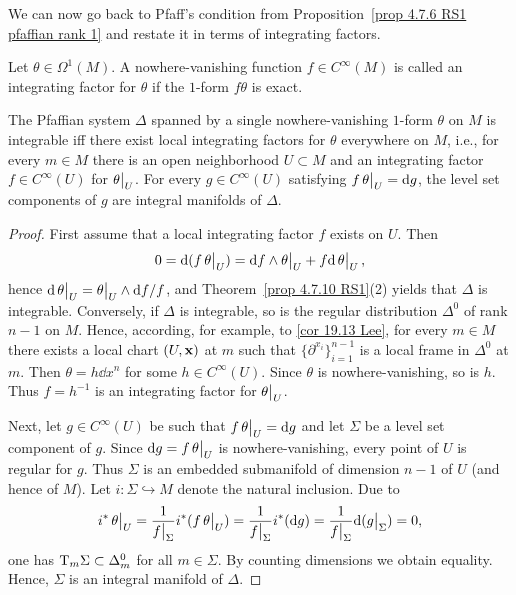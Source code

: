We can now go back to Pfaff's condition from Proposition~\ref{prop 4.7.6 RS1 pfaffian rank 1} and restate it in terms of integrating factors.

\begin{defn}
    Let $\theta\in\Omega^1(M)$. A nowhere-vanishing function $f\in C^\infty(M)$ is called an integrating factor for $\theta$ if the $1$-form $f\theta$ is exact.
\end{defn}

\begin{prop}[{{\cite[Prop.~4.7.13]{RS1}}}]\label{prop 4.7.13 RS1}
    The Pfaffian system $\Delta$ spanned by a single nowhere-vanishing $1$-form $\theta$ on $M$ is integrable iff there exist local integrating factors for $\theta$ everywhere on $M$, i.e., for every $m\in M$ there is an open neighborhood $U\subset M$ and an integrating factor $f\in C^\infty(U)$ for $\restr{\theta}{U}$. For every $g\in C^\infty(U)$ satisfying $f\restr{\theta}{U}=\dd g$, the level set components of $g$ are integral manifolds of $\Delta$.
\end{prop}
\begin{proof}
    First assume that a local integrating factor $f$ exists on $U$. Then 
    \[0=\dd(f\restr{\theta}{U})=\dd f\wedge\restr{\theta}{U}+f\dd\restr{\theta}{U},\]
    hence $\dd\restr{\theta}{U}=\restr{\theta}{U}\wedge \dd f/f$, and Theorem~\ref{prop 4.7.10 RS1}(2) yields that $\Delta$ is integrable. Conversely, if $\Delta$ is integrable, so is the regular distribution $\Delta^0$ of rank $n-1$ on $M$. Hence, according, for example, to \ref{cor 19.13 Lee}, for every $m\in M$ there exists a local chart $(U,\bf{x})$ at $m$ such that $\{\partial^{x_i}\}_{i=1}^{n-1}$ is a local frame in $\Delta^0$ at $m$. Then $\theta=h\dd x^n$ for some $h\in C^\infty(U)$. Since $\theta$ is nowhere-vanishing, so is $h$. Thus $f=h^{-1}$ is an integrating factor for $\restr{\theta}{U}$.

    Next, let $g\in C^\infty(U)$ be such that $f\restr{\theta}{U}=\dd g$ and let $\Sigma$ be a level set component of $g$. Since $\dd g=f\restr{\theta}{U}$ is nowhere-vanishing, every point of $U$ is regular for $g$. Thus $\Sigma$ is an embedded submanifold of dimension $n-1$ of $U$ (and hence of $M$). Let $i:\Sigma\hookrightarrow M$ denote the natural inclusion. Due to
    \[i^\ast\restr{\theta}{U}=\frac{1}{\restr{f}{\Sigma}}i^\ast(f\restr{\theta}{U})=\frac{1}{\restr{f}{\Sigma}}i^\ast(\dd g)=\frac{1}{\restr{f}{\Sigma}}\dd(\restr{g}{\Sigma})=0, \]
    one has $\T_m\Sigma\subset\Delta_m^0$ for all $m\in\Sigma$. By counting dimensions we obtain equality. Hence, $\Sigma$ is an integral manifold of $\Delta$.
\end{proof}


